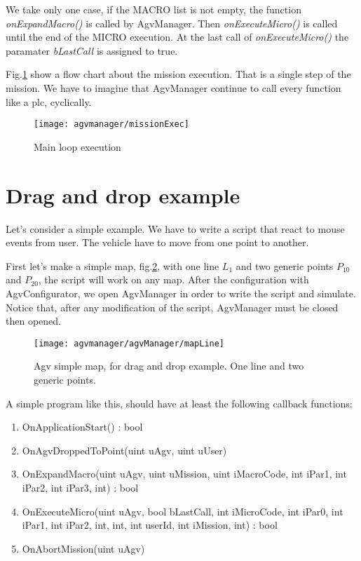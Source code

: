 We take only one case, if the MACRO list is not empty, the function \textit{onExpandMacro()} is called by AgvManager.
Then \textit{onExecuteMicro()} is called until the end of the MICRO execution. At the last call of \textit{onExecuteMicro()} the paramater \textit{bLastCall} is assigned to true.

Fig.\ref{fig:missionExec} show a flow chart about the mission execution.
That is a single step of the mission. We have to imagine that AgvManager continue to call every function like a plc, cyclically.

\begin{figure}
	\centering\texttt{[image: agvmanager/missionExec]}
	\caption{Main loop execution}
	\label{fig:missionExec}
\end{figure}

\section{Drag and drop example}
Let's consider a simple example. We have to write a script that react to mouse events from user. The vehicle have to move from one point to another.

First let's make a simple map, fig.\ref{fig:mapLine}, with one line $L_{1}$ and two generic points $P_{10}$ and $P_{20}$, the script will work on any map.
After the configuration with AgvConfigurator, we open AgvManager in order to write the script and simulate.
Notice that, after any modification of the script, AgvManager must be closed then opened.\\

\begin{figure}
	\centering\texttt{[image: agvmanager/agvManager/mapLine]}
	\caption{Agv simple map, for drag and drop example. One line and two generic points.}
	\label{fig:mapLine}
\end{figure}

A simple program like this, should have at least the following callback functions:
\begin{enumerate}  
	\item OnApplicationStart() : bool 
	\item OnAgvDroppedToPoint(uint uAgv, uint uUser) 
	\item OnExpandMacro(uint uAgv, uint uMission, uint iMacroCode, int iPar1, int iPar2, int iPar3, int) : bool
	\item OnExecuteMicro(uint uAgv, bool bLastCall, int iMicroCode, int iPar0, int iPar1, int iPar2, int, int, int userId, int iMission, int) : bool
	\item OnAbortMission(uint uAgv)\\
\end{enumerate}

